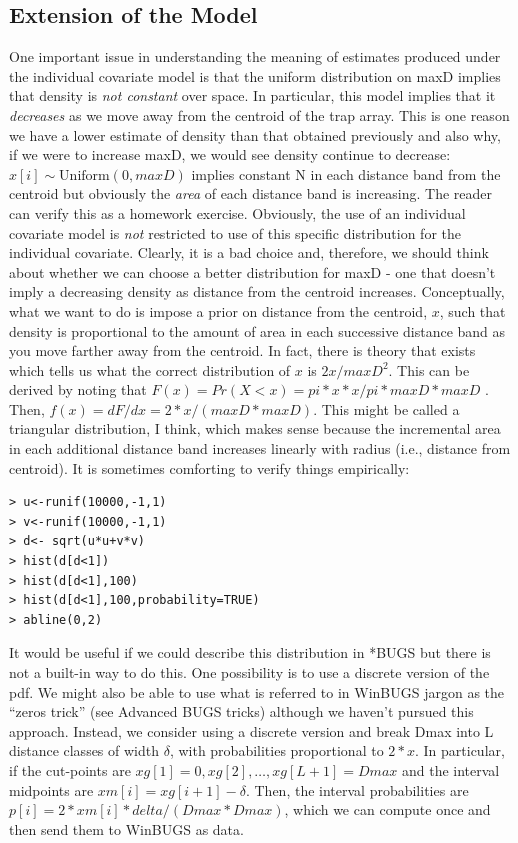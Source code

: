 \subsection{Extension of the Model}
One important issue in understanding the meaning of estimates produced under the individual covariate model  is that the uniform distribution on maxD implies that density is {\it not constant} over space. In particular, this model implies that it {\it decreases} as we move away from the centroid of the trap array. This is one reason we have a lower estimate of density than that obtained previously and also why, if we were to increase maxD, we would see density continue to decrease: $x[i] \sim \mbox{Uniform}(0,maxD)$ implies constant N in each distance band from the centroid but obviously the {\it area} of each distance band is increasing.  The reader can verify this as a homework exercise. 
Obviously, the use of an individual covariate model is {\it not} restricted to use of this specific distribution for the individual covariate. Clearly, it is a bad choice and, therefore,  we should think about whether we can choose a better distribution for maxD - one that doesn't imply a decreasing density as distance from the centroid increases.  Conceptually, what we want to do is impose a prior on distance from the centroid, $x$, such that density is proportional to the amount of area in each successive distance band as you move farther away from the centroid.  In fact, there is theory that exists which tells us what the correct distribution of $x$ is $2x/maxD^2$. This can be derived by noting that $F(x) = Pr(X<x) = pi*x*x/pi*maxD*maxD$ . Then, $f(x) = dF/dx = 2*x/(maxD*maxD)$.  This might be called a triangular distribution, I think, which makes sense because the incremental area in each additional distance band increases linearly with radius (i.e., distance from centroid). It is sometimes comforting to verify things empirically:
\begin{verbatim}
> u<-runif(10000,-1,1)
> v<-runif(10000,-1,1)
> d<- sqrt(u*u+v*v)
> hist(d[d<1])
> hist(d[d<1],100)
> hist(d[d<1],100,probability=TRUE)
> abline(0,2)
\end{verbatim}

It would be useful if we could describe this distribution in *BUGS but there is not a built-in way to do this.  One possibility is to use a discrete version of the pdf. We might also be able to use what is referred to in WinBUGS jargon as the ``zeros trick'' (see Advanced BUGS tricks) although we haven't pursued this approach. Instead, we consider using a discrete version and break Dmax into L distance classes of width $\delta$, with probabilities proportional to $2*x$. In particular, if the cut-points are $xg[1]=0,xg[2], \ldots, xg[L+1]=Dmax$ and the interval midpoints are $xm[i] = xg[i+1]-\delta$. Then, the interval probabilities are $p[i] = 2*xm[i]*delta/(Dmax*Dmax)$, which we can compute once and then send them to WinBUGS as data.

